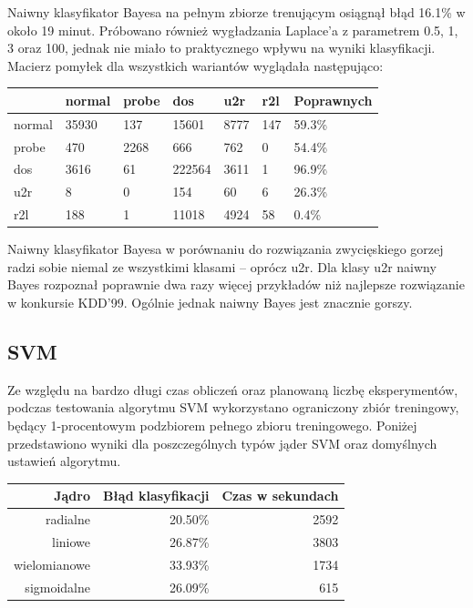 \documentclass[a4paper, 12pt]{article}
\begin{document}
Naiwny klasyfikator Bayesa na pełnym zbiorze trenującym osiągnął błąd 16.1\% w około 19
minut.
Próbowano również wygładzania Laplace'a z parametrem 0.5, 1, 3 oraz 100, jednak
nie miało to praktycznego wpływu na wyniki klasyfikacji. Macierz pomyłek dla wszystkich
wariantów wyglądała następująco:

\begin{table}[H]
\centering
\begin{tabular}{ | l | l | l | l | l | l | l | } \hline
	& normal & probe & dos 	& u2r 	& r2l 	& Poprawnych	\\ \hline
normal 	& 35930 & 137 	& 15601	& 8777	& 147 	& 59.3\% 	\\ \hline
probe 	& 470 	& 2268 	& 666	& 762	& 0 	& 54.4\% 	\\ \hline
dos 	& 3616 	& 61 	& 222564& 3611 	& 1 	& 96.9\% 	\\ \hline
u2r 	& 8 	& 0 	& 154	& 60	& 6	& 26.3\%	\\ \hline
r2l 	& 188 	& 1 	& 11018	& 4924	& 58	& 0.4\%		\\ \hline
\end{tabular} 
\end{table}

Naiwny klasyfikator Bayesa w porównaniu do rozwiązania zwycięskiego gorzej radzi sobie
niemal ze wszystkimi klasami -- oprócz u2r. Dla klasy u2r naiwny Bayes rozpoznał poprawnie
dwa razy więcej przykładów niż najlepsze rozwiązanie w konkursie KDD'99. 
Ogólnie jednak naiwny Bayes jest znacznie gorszy.

\subsection{SVM}

Ze względu na bardzo długi czas obliczeń oraz planowaną liczbę eksperymentów, podczas testowania algorytmu SVM wykorzystano ograniczony zbiór treningowy, będący 1-procentowym
podzbiorem pełnego zbioru treningowego. Poniżej przedstawiono wyniki dla poszczególnych typów jąder SVM oraz domyślnych ustawień algorytmu.

\begin{table}[H]
\centering
\begin{tabular}{ | r | r | r | } \hline
Jądro & Błąd klasyfikacji & Czas w sekundach \\ \hline
radialne & 20.50\% & 2592 \\ \hline
liniowe & 26.87\% & 3803 \\ \hline
wielomianowe & 33.93\% & 1734 \\ \hline
sigmoidalne & 26.09\% & 615 \\ \hline
\end{tabular} 
\end{table}
\end{document}
